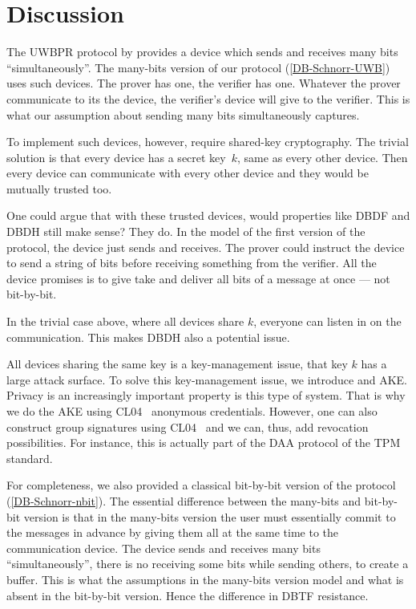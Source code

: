 \section{Discussion}%
\label{Discussion}

The UWBPR protocol by \textcite{UWBPR} provides a device which sends and 
receives many bits \enquote{simultaneously}.
The many-bits version of our protocol (\cref{DB-Schnorr-UWB}) uses such 
devices.
The prover has one, the verifier has one.
Whatever the prover communicate to its the device, the verifier's device will 
give to the verifier.
This is what our assumption about sending many bits simultaneously captures.

To implement such devices, however, require shared-key cryptography.
The trivial solution is that every device has a secret key~\(k\), same as every 
other device.
Then every device can communicate with every other device and they would be 
mutually trusted too.

One could argue that with these trusted devices, would properties like 
\ac{DBDF} and \ac{DBDH} still make sense?
They do.
In the model of the first version of the protocol, the device just sends and 
receives.
The prover could instruct the device to send a string of bits before receiving 
something from the verifier.
All the device promises is to give take and deliver all bits of a message at 
once --- not bit-by-bit.

In the trivial case above, where all devices share \(k\), everyone can listen 
in on the communication.
This makes \ac{DBDH} also a potential issue.

All devices sharing the same key is a key-management issue, that key \(k\) has 
a large attack surface.
To solve this key-management issue, we introduce  and \ac{AKE}.
Privacy is an increasingly important property is this type of system.
That is why we do the \ac{AKE} using CL04~\cite{CLsignatures} anonymous 
credentials.
However, one can also construct group signatures using CL04~\cite{CLsignatures} 
and we can, thus, add revocation possibilities.
For instance, this is actually part of the \ac{DAA} protocol of the \ac{TPM} 
standard.

For completeness, we also provided a classical bit-by-bit version of the 
protocol (\cref{DB-Schnorr-nbit}).
The essential difference between the many-bits and bit-by-bit version is that 
in the many-bits version the user must essentially commit to the messages in 
advance by giving them all at the same time to the communication device.
The device sends and receives many bits \enquote{simultaneously}, there is no 
receiving some bits while sending others, to create a buffer.
This is what the assumptions in the many-bits version model and what is absent 
in the bit-by-bit version.
Hence the difference in \ac{DBTF} resistance.

